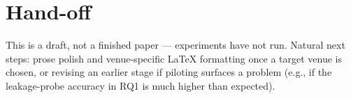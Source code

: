 \documentclass[11pt]{article}
\begin{document}
\section*{Hand-off}
This is a draft, not a finished paper --- experiments have not run. Natural next steps: prose polish and venue-specific LaTeX formatting once a target venue is chosen, or revising an earlier stage if piloting surfaces a problem (e.g., if the leakage-probe accuracy in RQ1 is much higher than expected).



\end{document}

